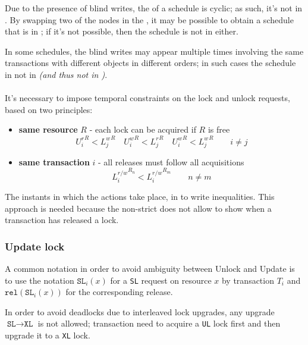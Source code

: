 \documentclass[english]{article}
\begin{document}
Due to the presence of blind writes, the \CG of a schedule is cyclic;
as such, it's not in \CSR.
By swapping two of the nodes in the \CG, it may be possible to obtain a schedule that is in \VSR;
if it's not possible, then the schedule is not in \VSR either.

In some schedules, the blind writes may appear multiple times involving the same transactions with different objects in different orders;
in such cases the schedule in not in \CSR \textit{(and thus not in \VSR)}.

\paragraph{\TPL}

It's necessary to impose temporal constraints on the lock and unlock requests, based on two principles:

\begin{itemize}
  \item \textbf{same resource} \(R\) - each lock can be acquired if \(R\) is free
  \[ {U^r_i}^R < {L^w_j}^R \quad {U^w_i}^R < {L^r_j}^R \quad {U^w_i}^R < {L^w_j}^R \qquad i \neq j \]
  \item \textbf{same transaction} \(i\) - all releases must follow all acquisitions
  \[{L^{r/w}_i}^{R_n} < {L^{r/w}_i}^{R_m} \qquad n \neq m \]
\end{itemize}

The instants in which the actions take place, in to write inequalities.
This approach is needed because the non-strict \TPL does not allow to show when a transaction has released a lock.

\subsubsection{Update lock}

A common notation in order to avoid ambiguity between Unlock and Update is to use the notation \(\texttt{SL}_i(x)\) for a \texttt{SL} request on resource \(x\) by transaction \(T_i\) and \(\texttt{rel}(\texttt{SL}_i(x))\) for the corresponding release.

In order to avoid deadlocks due to interleaved lock upgrades, any upgrade \(\texttt{SL} \rightarrow \texttt{XL}\) is not allowed;
transaction need to acquire a \texttt{UL} lock first and then upgrade it to a \texttt{XL} lock.
\end{document}

